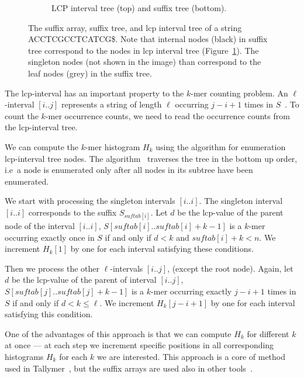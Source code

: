 \begin{figure}[htp]
\begin{subfigure}[m]{0.47\textwidth}
   \caption{LCP interval tree (top) and suffix tree (bottom).}\label{fig:enhancedsuffixarraytree}
\end{subfigure}
\caption[The suffix array, suffix tree, and lcp interval tree]{The suffix array, suffix tree, and lcp interval tree of a string ACCTCGCCTCATCG\$. Note that internal nodes (black) in suffix tree correspond to the nodes in lcp interval tree (Figure~\ref{fig:enhancedsuffixarraytree}). The singleton nodes (not shown in the image) than correspond to the leaf nodes (grey) in the suffix tree.}\label{fig:enhancedsuffixarray}
\end{figure}
The lcp-interval has an important property to the $k$-mer counting problem. An $\ell$-interval $[i..j]$ represents a string of length $\ell$ occurring $j - i + 1$ times in $S$~\cite{tallymer}. To count the $k$-mer occurrence counts, we need to read the occurrence counts from the lcp-interval tree.

We can compute the $k$-mer histogram $H_k$ using the algorithm for enumeration lcp-interval tree nodes. The algorithm~\cite{enhancedsuffixarrays} traverses the tree in the bottom up order, i.e\ a node is enumerated only after all nodes in its subtree have been enumerated.

We start with processing the singleton intervals $[i..i]$. The singleton interval $[i..i]$ corresponds to the suffix $S_{suftab[i]}$. Let $d$ be the lcp-value of the parent node of the interval $[i..i]$, $S[suftab[i]..suftab[i]+k-1]$ is a $k$-mer occurring exactly once in $S$ if and only if $d < k$ and $suftab[i]+k < n$. We increment $H_k[1]$ by one for each interval satisfying these conditions.

Then we process the other $\ell$-intervals $[i..j]$, (except the root node). Again, let $d$ be the lcp-value of the parent of interval $[i..j]$, $S[suftab[j]..suftab[j] + k - 1]$ is a $k$-mer occurring exactly $j - i + 1$ times in $S$ if and only if $d < k \leq \ell$. We increment $H_k[j-i+1]$ by one for each interval satisfying this condition.

One of the advantages of this approach is that we can compute $H_k$ for different $k$ at once --- at each step we increment specific positions in all corresponding histograms $H_k$ for each $k$ we are interested. This approach is a core of method used in Tallymer~\cite{tallymer}, but the suffix arrays are used also in other tools~\cite{jellyfish}.

